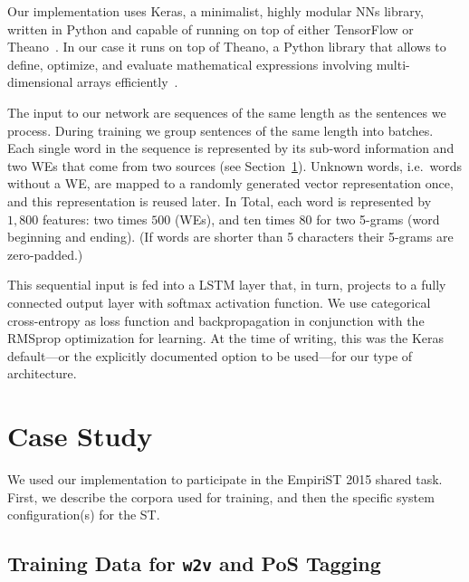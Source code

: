 \documentclass[11pt]{article}
\newcommand\wtv{\texttt{w2v}\xspace}
\begin{document}
Our implementation uses Keras, a minimalist, highly modular NNs library,
written in Python and capable of running on top of either TensorFlow or
Theano~\cite{chollet2015}. 
In our case it runs on top of Theano, a Python library that allows to define,
optimize, and evaluate mathematical expressions involving multi-dimensional
arrays efficiently~\cite{Theano2016}.

The input to our network are sequences of the same length as the sentences we
process.
During training we group sentences of the same length into batches.
Each single word in the sequence is represented by its sub-word information and
two WEs that come from two sources (see Section~\ref{sec:casestudies}).
Unknown words, i.e.~words without a WE, are mapped to a randomly generated
vector representation once, and this representation is reused later.
In Total, each word is represented by $1,800$ features: two times $500$ (WEs),
and ten times $80$ for two 5-grams (word beginning and ending).
(If words are shorter than 5 characters their 5-grams are zero-padded.)

This sequential input is fed into a LSTM layer that, in turn, projects to a
fully connected output layer with softmax activation function.
We use categorical cross-entropy as loss function and backpropagation in
conjunction with the RMSprop optimization for learning.  
At the time of writing, this was the Keras default---or the explicitly
documented option to be used---for our type of architecture. 


\section{Case Study} %
\label{sec:casestudies}

We used our implementation to participate in the EmpiriST 2015 shared task.
First, we describe the corpora used for training, and then the specific system
configuration(s) for the ST.


\subsection{Training Data for \wtv and PoS Tagging} %
\end{document}
